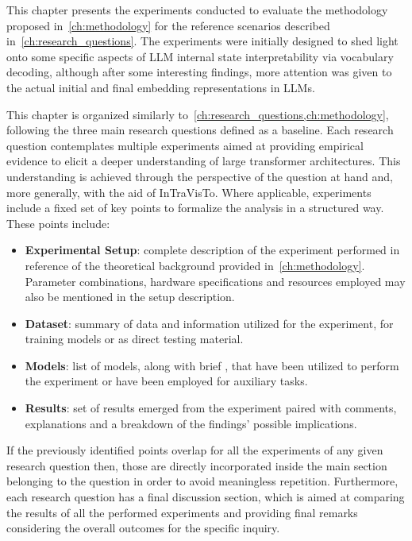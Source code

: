 This chapter presents the experiments conducted to evaluate the methodology proposed in~\cref{ch:methodology} for the reference scenarios described in~\cref{ch:research_questions}.
The experiments were initially designed to shed light onto some specific aspects of LLM internal state interpretability via vocabulary decoding, although after some interesting findings, more attention was given to the actual initial and final embedding representations in LLMs.

This chapter is organized similarly to~\cref{ch:research_questions,ch:methodology}, following the three main research questions defined as a baseline.
Each research question contemplates multiple experiments aimed at providing empirical evidence to elicit a deeper understanding of large transformer architectures.
This understanding is achieved through the perspective of the question at hand and, more generally, with the aid of InTraVisTo.
Where applicable, experiments include a fixed set of key points to formalize the analysis in a structured way.
These points include:
\begin{itemize}
    \item \textbf{Experimental Setup}: complete description of the experiment performed in reference of the theoretical background provided in~\cref{ch:methodology}.
Parameter combinations, hardware specifications and resources employed may also be mentioned in the setup description.
    \item \textbf{Dataset}: summary of data and information utilized for the experiment,  for training models or as direct testing material.
    \item \textbf{Models}: list of models, along with brief , that have been utilized to perform the experiment or have been employed for auxiliary tasks.
    \item \textbf{Results}: set of results emerged from the experiment paired with comments, explanations and a breakdown of the findings' possible implications.
\end{itemize}
If the previously identified points overlap for all the  experiments of any given research question then, those are directly incorporated inside the main section belonging to the question in order to avoid meaningless repetition.
Furthermore, each research question has a final discussion section, which is aimed at comparing the results of all the performed experiments and providing final remarks considering the overall outcomes for the specific inquiry.

